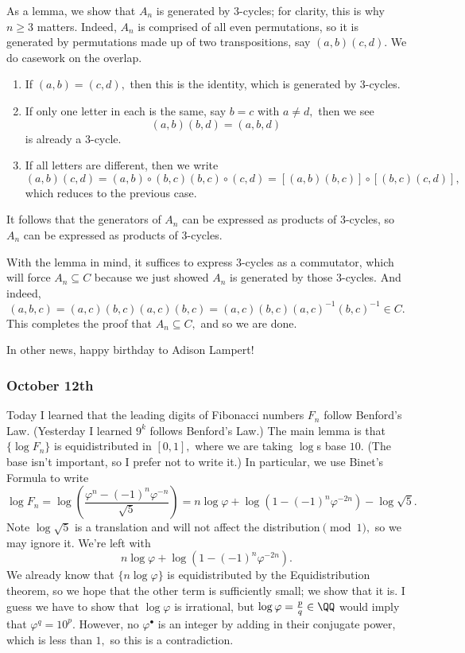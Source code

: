 As a lemma, we show that $A_n$ is generated by $3$-cycles; for clarity, this is why $n\ge3$ matters. Indeed, $A_n$ is comprised of all even permutations, so it is generated by permutations made up of two transpositions, say $(a,b)(c,d).$ We do casework on the overlap.
\begin{enumerate}[label=(\roman*)]
    \item If $(a,b)=(c,d),$ then this is the identity, which is generated by $3$-cycles.
    \item If only one letter in each is the same, say $b=c$ with $a\ne d,$ then we see
    \[(a,b)(b,d)=(a,b,d)\]
    is already a $3$-cycle.
    \item If all letters are different, then we write
    \[(a,b)(c,d)=(a,b)\circ(b,c)(b,c)\circ(c,d)=[(a,b)(b,c)]\circ[(b,c)(c,d)],\]
    which reduces to the previous case.
\end{enumerate}
It follows that the generators of $A_n$ can be expressed as products of $3$-cycles, so $A_n$ can be expressed as products of $3$-cycles.

With the lemma in mind, it suffices to express $3$-cycles as a commutator, which will force $A_n\subseteq C$ because we just showed $A_n$ is generated by those $3$-cycles. And indeed,
\[(a,b,c)=(a,c)(b,c)(a,c)(b,c)=(a,c)(b,c)(a,c)^{-1}(b,c)^{-1}\in C.\]
This completes the proof that $A_n\subseteq C,$ and so we are done.

In other news, happy birthday to Adison Lampert!

\subsubsection{October 12th}
Today I learned that the leading digits of Fibonacci numbers $F_n$ follow Benford's Law. (Yesterday I learned $9^k$ follows Benford's Law.) The main lemma is that $\{\log F_n\}$ is equidistributed in $[0,1],$ where we are taking $\log$s base $10.$ (The base isn't important, so I prefer not to write it.) In particular, we use Binet's Formula to write
\[\log F_n=\log\left(\frac{\varphi^n-(-1)^n\varphi^{-n}}{\sqrt5}\right)=n\log\varphi+\log\left(1-(-1)^n\varphi^{-2n}\right)-\log\sqrt5.\]
Note $\log\sqrt5$ is a translation and will not affect the distribution$\pmod1,$ so we may ignore it. We're left with
\[n\log\varphi+\log\left(1-(-1)^n\varphi^{-2n}\right).\]
We already know that $\{n\log\varphi\}$ is equidistributed by the Equidistribution theorem, so we hope that the other term is sufficiently small; we show that it is. I guess we have to show that $\log\varphi$ is irrational, but $\log\varphi=\frac pq\in\QQ$ would imply that $\varphi^q=10^p.$ However, no $\varphi^\bullet$ is an integer by adding in their conjugate power, which is less than $1,$ so this is a contradiction.

